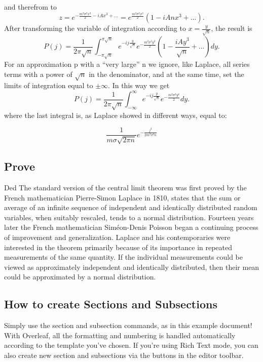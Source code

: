 \documentclass{article}
\begin{document}
and therefrom to
\[  z= e^{-\frac{m^2\sigma^2x^2}{2} -iAx^3 + ...}= e^{\frac{m^2\sigma^2x^2}{2}}(1-iAnx^3+...).   \]
After transforming the variable of integration according to $ x= \frac{y}{\sqrt{n}}$, the result is 
\[ P(j) = \frac{1}{2\pi\sqrt{n}} \int _{-\pi\sqrt{n}}^{\pi\sqrt{n}} e^{-ij\frac{y}{\sqrt{n}}}          e^{-\frac{m^2\sigma^2y^2}{2}}  ( 1 - \frac{iAy^3}{\sqrt{n}} + ...)  dy. \] For an approximation p with a “very large” n we ignore, like Laplace, all series terms  with a power of $ \sqrt{n}$ in the denominator, and at the same time, set the limits of integration equal to $\pm \infty$.   
In this way we get
\[ P(j) = \frac{1}{2\pi\sqrt{n}} \int _{- \infty}^{\infty}  e^{-ij\frac{y}{\sqrt{n}}}          e^{-\frac{m^2\sigma^2y^2}{2}}  dy. \]
where the last integral is, as Laplace showed in different ways, equal to:

\[  \frac{1}{m\sigma\sqrt{2\pi n}}e^{-\frac{j^2}{2m^2\sigma^2n}}  \]
\subsection{Prove}Ded
The standard version of the central limit theorem was first proved by the French mathematician Pierre-Simon Laplace in 1810, states that the sum or average of an infinite sequence of independent and identically distributed random variables, when suitably rescaled, tends to a normal distribution.
Fourteen years later the French mathematician Siméon-Denis Poisson began a continuing process of improvement and generalization.
Laplace and his contemporaries were interested in the theorem primarily because of its importance in repeated measurements of the same quantity. If the individual measurements could be viewed as approximately independent and identically distributed, then their mean could be approximated by a normal distribution.







\subsection{How to create Sections and Subsections}

  Simply use the section and subsection commands, as in this example document! With Overleaf, all the formatting and numbering is handled automatically according to the template you've chosen. If you're using Rich Text mode, you can also create new section and subsections via the buttons in the editor toolbar.
\end{document}

